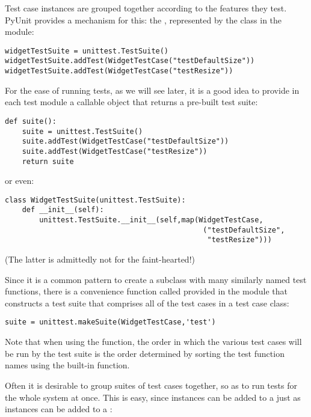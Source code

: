 Test case instances are grouped together according to the features
they test.  PyUnit provides a mechanism for this: the , represented by the class  in the
 module:

\begin{verbatim}
widgetTestSuite = unittest.TestSuite()
widgetTestSuite.addTest(WidgetTestCase("testDefaultSize"))
widgetTestSuite.addTest(WidgetTestCase("testResize"))
\end{verbatim}

For the ease of running tests, as we will see later, it is a good
idea to provide in each test module a callable object that returns a
pre-built test suite:

\begin{verbatim}
def suite():
    suite = unittest.TestSuite()
    suite.addTest(WidgetTestCase("testDefaultSize"))
    suite.addTest(WidgetTestCase("testResize"))
    return suite
\end{verbatim}

or even:

\begin{verbatim}
class WidgetTestSuite(unittest.TestSuite):
    def __init__(self):
        unittest.TestSuite.__init__(self,map(WidgetTestCase,
                                              ("testDefaultSize",
                                               "testResize")))
\end{verbatim}

(The latter is admittedly not for the faint-hearted!)

Since it is a common pattern to create a  subclass
with many similarly named test functions, there is a convenience
function called  provided in the
 module that constructs a test suite that
comprises all of the test cases in a test case class:

\begin{verbatim}
suite = unittest.makeSuite(WidgetTestCase,'test')
\end{verbatim}

Note that when using the  function, the order in
which the various test cases will be run by the test suite is the
order determined by sorting the test function names using the
 built-in function.

Often it is desirable to group suites of test cases together, so as to
run tests for the whole system at once.  This is easy, since
 instances can be added to a  just
as  instances can be added to a :

